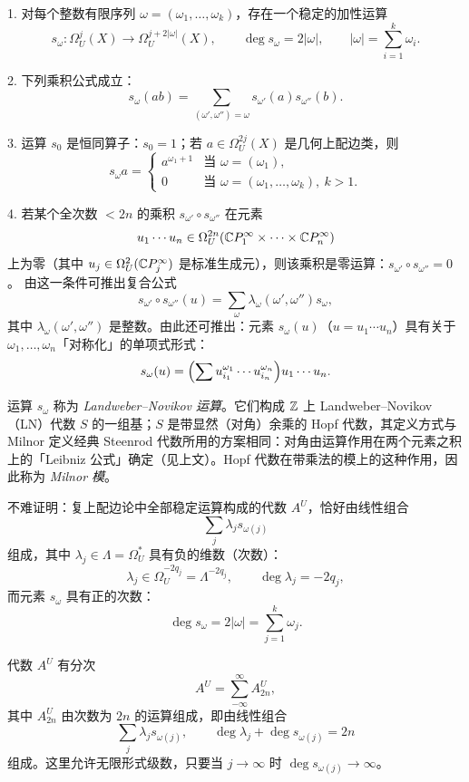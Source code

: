 1. 对每个整数有限序列 $\omega=(\omega_1,\ldots,\omega_k)$，存在一个稳定的加性运算
\begin{equation}
s_\omega:\Omega_U^j(X)\to\Omega_U^{j+2|\omega|}(X),\qquad \deg s_\omega=2|\omega|,\qquad |\omega|=\sum_{i=1}^k\omega_i. \tag{9.6}
\end{equation}

2. 下列乘积公式成立：
\[
s_\omega(ab)=\sum_{(\omega',\omega'')=\omega}s_{\omega'}(a)s_{\omega''}(b).
\]

3. 运算 $s_0$ 是恒同算子：$s_0=1$；若 $a\in\Omega_U^{2j}(X)$ 是几何上配边类，则
\[
s_\omega a=\begin{cases}a^{\omega_1+1} & \text{当 }\omega=(\omega_1),\\ 0 & \text{当 }\omega=(\omega_1,\ldots,\omega_k),\ k>1.\end{cases}
\]

4. 若某个全次数 $<2n$ 的乘积 $s_{\omega'}\circ s_{\omega''}$ 在元素
\[
u_1\cdots u_n\in\Omega_U^{2n}(\mathbb{C}P_1^\infty\times\cdots\times\mathbb{C}P_n^\infty)
\]
上为零（其中 $u_j\in\Omega_U^2(\mathbb{C}P_j^\infty)$ 是标准生成元），则该乘积是零运算：$s_{\omega'}\circ s_{\omega''}=0$。
由这一条件可推出复合公式
\[
s_{\omega'}\circ s_{\omega''}(u)=\sum_\omega\lambda_\omega(\omega',\omega'')s_\omega,
\]
其中 $\lambda_\omega(\omega',\omega'')$ 是整数。由此还可推出：元素 $s_\omega(u)$（$u=u_1\cdots u_n$）具有关于 $\omega_1,\ldots,\omega_n$「对称化」的单项式形式：
\[
s_\omega(u)=\Bigl(\sum u_{i_1}^{\omega_1}\cdots u_{i_n}^{\omega_n}\Bigr)u_1\cdots u_n.
\]

运算 $s_\omega$ 称为 \emph{Landweber--Novikov 运算}。它们构成 $\mathbb{Z}$ 上 Landweber--Novikov（LN）代数 $S$ 的一组基；$S$ 是带显然（对角）余乘的 Hopf 代数，其定义方式与 Milnor 定义经典 Steenrod 代数所用的方案相同：对角由运算作用在两个元素之积上的「Leibniz 公式」确定（见上文）。Hopf 代数在带乘法的模上的这种作用，因此称为 \emph{Milnor 模}。

不难证明：复上配边论中全部稳定运算构成的代数 $A^U$，恰好由线性组合
\[
\sum_j\lambda_j s_{\omega(j)}
\]
组成，其中 $\lambda_j\in\Lambda=\Omega_U^*$ 具有负的维数（次数）：
\[
\lambda_j\in\Omega_U^{-2q_j}=\Lambda^{-2q_j},\qquad \deg\lambda_j=-2q_j,
\]
而元素 $s_\omega$ 具有正的次数：
\[
\deg s_\omega=2|\omega|=\sum_{j=1}^k\omega_j.
\]

代数 $A^U$ 有分次
\[
A^U=\sum_{-\infty}^{\infty}A_{2n}^U,
\]
其中 $A_{2n}^U$ 由次数为 $2n$ 的运算组成，即由线性组合
\[
\sum_j\lambda_j s_{\omega(j)},\qquad \deg\lambda_j+\deg s_{\omega(j)}=2n
\]
组成。这里允许无限形式级数，只要当 $j\to\infty$ 时 $\deg s_{\omega(j)}\to\infty$。


